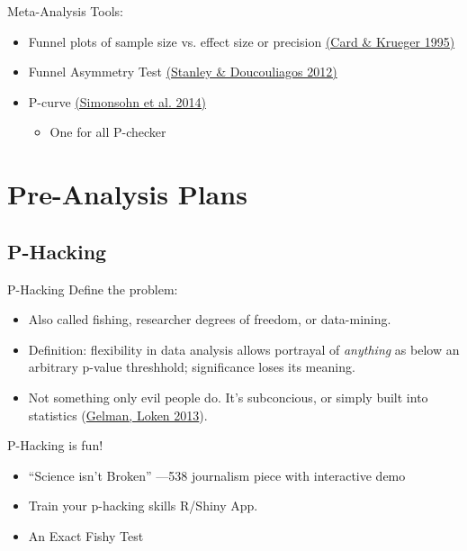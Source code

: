 \documentclass{beamer}
\begin{document}
\begin{frame}{Meta-Analysis}
Tools:
\begin{itemize}[<.->]
\item Funnel plots of sample size vs. effect size or precision \href{http://www.jstor.org/stable/2117925}{(Card \& Krueger 1995)}
\item Funnel Asymmetry Test \href{https://books.google.com/books?id=jSQEdEsL7VoC}{(Stanley \& Doucouliagos 2012)}
\item P-curve \href{http://p-curve.com/}{(Simonsohn et al. 2014)} \href{http://p-curve.com/}{}
\begin{itemize}
	\item One for all P-checker \href{http://shinyapps.org/apps/p-checker/}{}	
\end{itemize}
\end{itemize}
\end{frame}
\section{Pre-Analysis Plans}
\subsection*{P-Hacking}
\begin{frame}[<.->]{P-Hacking}
Define the problem:
\begin{itemize}
\item
Also called fishing, researcher degrees of freedom, or data-mining.
\item
Definition: flexibility in data analysis allows portrayal of \textit{anything} as below an arbitrary p-value threshhold; significance loses its meaning.
\item
Not something only evil people do. It's subconcious, or simply built into statistics (\href{http://www.stat.columbia.edu/~gelman/research/unpublished/p_hacking.pdf}{Gelman, Loken 2013}).
\end{itemize}
\end{frame}

\begin{frame}{P-Hacking is fun!}
\begin{itemize}
\item
``Science isn't Broken'' ---538 journalism piece with interactive demo \href{http://fivethirtyeight.com/features/science-isnt-broken}{}
\item 
Train your p-hacking skills R/Shiny App. \href{http://www.nicebread.de/introducing-p-hacker/}{}
\item
An Exact Fishy Test \href{https://macartan.shinyapps.io/fish/}{}
\end{itemize}
\end{frame}
\end{document}
